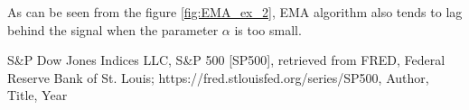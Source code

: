 \documentclass[a4paper,12pt,fleqn]{article}
\begin{document}
            As can be seen from the figure \ref{fig:EMA_ex_2}, EMA algorithm also tends to lag behind the signal when the
            parameter \begin{math}
                \alpha
                \end{math} is too small.
        \newpage
        \begin{thebibliography}{99}
         S\&P Dow Jones Indices LLC, S\&P 500 [SP500], retrieved from FRED, Federal Reserve Bank of St. Louis; https://fred.stlouisfed.org/series/SP500, 
         Author, Title, Year
        \end{thebibliography}
         
\end{document}
